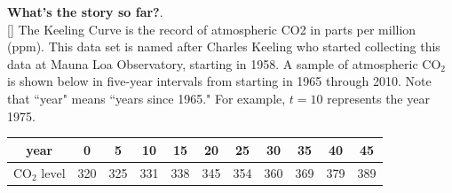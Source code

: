\documentclass[10pt]{article}
\begin{document}
\newpage

{\bf What's the story so far?}. \mod \\
[]{
The Keeling Curve is the record of atmospheric CO2 in parts per million (ppm). This data set is named after Charles Keeling who started collecting this data at Mauna Loa Observatory, starting in 1958.  A sample of atmospheric CO$_2$ is shown below in five-year intervals from starting in 1965 through 2010.  Note that ``year" means ``years since 1965."  For example, $t=10$ represents the year 1975.
}{
}

\begin{center}
\begin{tabular}{|c|c|c|c|c|c|c|c|c|c|c|}
\hline
year & 0 & 5 & 10 & 15 & 20 & 25 & 30 & 35 & 40 & 45 \\
\hline
CO$_2$ level & 320 & 325 & 331 & 338 & 345 & 354 & 360 & 369 & 379 & 389 \\
\hline
\end{tabular}
\end{center}
\end{document}

